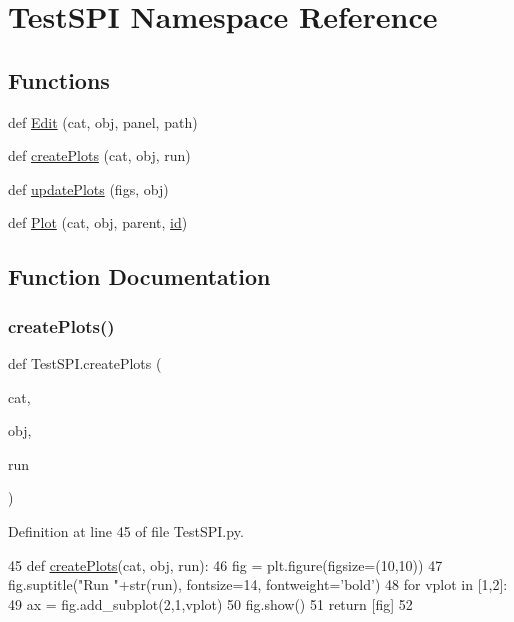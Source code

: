 \hypertarget{namespaceTestSPI}{}\section{Test\+S\+PI Namespace Reference}
\label{namespaceTestSPI}
\subsection*{Functions}
\begin{DoxyCompactItemize}
\item 
def \hyperlink{namespaceTestSPI_a429973652f05db8fc083bd9fd23aec45}{Edit} (cat, obj, panel, path)
\item 
def \hyperlink{namespaceTestSPI_a65240a18ad5f101a6f1ef2f48599e4e4}{create\+Plots} (cat, obj, run)
\item 
def \hyperlink{namespaceTestSPI_a3663ea314c061192225a8256794f56c9}{update\+Plots} (figs, obj)
\item 
def \hyperlink{namespaceTestSPI_aa79a00eee7db10f56d427696a5724a8a}{Plot} (cat, obj, parent, \hyperlink{classObject_af99145335cc61ff6e2798ea17db009d2}{id})
\end{DoxyCompactItemize}


\subsection{Function Documentation}
\mbox{\label{namespaceTestSPI_a65240a18ad5f101a6f1ef2f48599e4e4}} 
\subsubsection{\texorpdfstring{create\+Plots()}{createPlots()}}
{\footnotesize\ttfamily def Test\+S\+P\+I.\+create\+Plots (\begin{DoxyParamCaption}\item[{}]{cat,  }\item[{}]{obj,  }\item[{}]{run }\end{DoxyParamCaption})}



Definition at line 45 of file Test\+S\+P\+I.\+py.


\begin{DoxyCode}
45 \textcolor{keyword}{def }\hyperlink{namespaceTestSPI_a65240a18ad5f101a6f1ef2f48599e4e4}{createPlots}(cat, obj, run):
46     fig = plt.figure(figsize=(10,10))
47     fig.suptitle(\textcolor{stringliteral}{"Run "}+str(run), fontsize=14, fontweight=\textcolor{stringliteral}{'bold'})
48     \textcolor{keywordflow}{for} vplot \textcolor{keywordflow}{in} [1,2]:
49         ax = fig.add\_subplot(2,1,vplot)
50     fig.show()    
51     \textcolor{keywordflow}{return} [fig]
52 
\end{DoxyCode}
\mbox{\label{namespaceTestSPI_a429973652f05db8fc083bd9fd23aec45}} 
